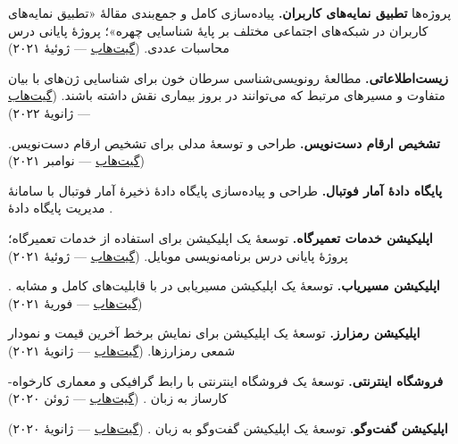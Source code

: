 \documentclass[11pt]{article}
\begin{document}
\begin{faSection}{پروژه‌ها}
\vspace{0.4em}
\textbf{تطبیق نمایه‌های کاربران.} پیاده‌سازی کامل و جمع‌بندی مقالۀ «تطبیق نمایه‌های کاربران در شبکه‌های اجتماعی مختلف بر پایۀ شناسایی چهره»؛ پروژۀ پایانی درس محاسبات عددی. (\href{https://github.com/kahbodaeini/Users_profile_matching}{گیت‌هاب} --- ژوئیۀ ۲۰۲۱)

\vspace{0.4em}
\textbf{زیست‌اطلاعاتی.} مطالعۀ رونویسی‌شناسی سرطان خون  برای شناسایی ژن‌های با بیان متفاوت و مسیرهای مرتبط که می‌توانند در بروز بیماری نقش داشته باشند. (\href{https://github.com/kahbodaeini/AML_Leukemia}{گیت‌هاب} --- ژانویۀ ۲۰۲۲)

\vspace{0.4em}
\textbf{تشخیص ارقام دست‌نویس.} طراحی و توسعۀ مدلی برای تشخیص ارقام دست‌نویس. (\href{https://github.com/kahbodaeini/AI}{گیت‌هاب} --- نوامبر ۲۰۲۱)

\vspace{0.4em}
\textbf{پایگاه دادۀ آمار فوتبال.} طراحی و پیاده‌سازی پایگاه دادۀ ذخیرۀ آمار فوتبال با سامانۀ مدیریت پایگاه دادۀ .

\vspace{0.4em}
\textbf{اپلیکیشن خدمات تعمیرگاه.} توسعۀ یک اپلیکیشن  برای استفاده از خدمات تعمیرگاه؛ پروژۀ پایانی درس برنامه‌نویسی موبایل. (\href{https://github.com/kahbodaeini/Garage}{گیت‌هاب} --- ژوئیۀ ۲۰۲۱)

\vspace{0.4em}
\textbf{اپلیکیشن مسیریاب.} توسعۀ یک اپلیکیشن مسیریابی در  با قابلیت‌های کامل و مشابه . (\href{https://github.com/kahbodaeini/Navigation_App}{گیت‌هاب} --- فوریۀ ۲۰۲۱)

\vspace{0.4em}
\textbf{اپلیکیشن رمزارز.} توسعۀ یک اپلیکیشن  برای نمایش برخط آخرین قیمت و نمودار شمعی رمزارزها. (\href{https://github.com/kahbodaeini/Cryptocurrency_App}{گیت‌هاب} --- ژانویۀ ۲۰۲۱)

\vspace{0.4em}
\textbf{فروشگاه اینترنتی.} توسعۀ یک فروشگاه اینترنتی با رابط گرافیکی و معماری کارخواه-کارساز به زبان . (\href{https://github.com/AdvProg2020/Project_team-39}{گیت‌هاب} --- ژوئن ۲۰۲۰)

\vspace{0.4em}
\textbf{اپلیکیشن گفت‌وگو.} توسعۀ یک اپلیکیشن گفت‌وگو به زبان . (\href{https://github.com/kahbodaeini/Chat_Application}{گیت‌هاب} --- ژانویۀ ۲۰۲۰)

\end{faSection}
\end{document}

